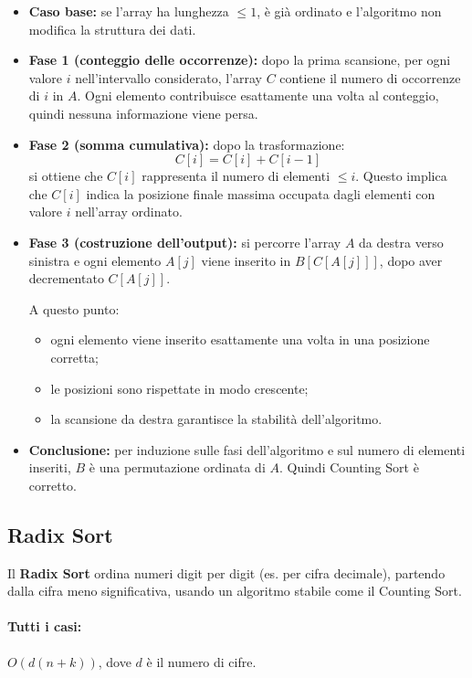 \documentclass[a4paper,12pt]{article}
\begin{document}
\begin{itemize}
    \item \textbf{Caso base:} se l'array ha lunghezza $\le 1$, è già ordinato e l'algoritmo non modifica la struttura dei dati.

    \item \textbf{Fase 1 (conteggio delle occorrenze):} 
    dopo la prima scansione, per ogni valore $i$ nell'intervallo considerato, l'array $C$ contiene il numero di occorrenze di $i$ in $A$.  
    Ogni elemento contribuisce esattamente una volta al conteggio, quindi nessuna informazione viene persa.

    \item \textbf{Fase 2 (somma cumulativa):}
    dopo la trasformazione:
    \[
    C[i] = C[i] + C[i-1]
    \]
    si ottiene che $C[i]$ rappresenta il numero di elementi $\le i$.  
    Questo implica che $C[i]$ indica la posizione finale massima occupata dagli elementi con valore $i$ nell'array ordinato.

    \item \textbf{Fase 3 (costruzione dell'output):}
    si percorre l'array $A$ da destra verso sinistra e ogni elemento $A[j]$ viene inserito in $B[C[A[j]]]$, dopo aver decrementato $C[A[j]]$.

    A questo punto:
    \begin{itemize}
        \item ogni elemento viene inserito esattamente una volta in una posizione corretta;
        \item le posizioni sono rispettate in modo crescente;
        \item la scansione da destra garantisce la stabilità dell'algoritmo.
    \end{itemize}

    \item \textbf{Conclusione:} per induzione sulle fasi dell'algoritmo e sul numero di elementi inseriti, $B$ è una permutazione ordinata di $A$. Quindi Counting Sort è corretto.
\end{itemize}

\subsection{Radix Sort}
Il \textbf{Radix Sort} ordina numeri digit per digit (es. per cifra decimale), partendo dalla cifra meno significativa, usando un algoritmo stabile come il Counting Sort.

\paragraph{Tutti i casi:} $O(d(n + k))$, dove $d$ è il numero di cifre.
\end{document}
